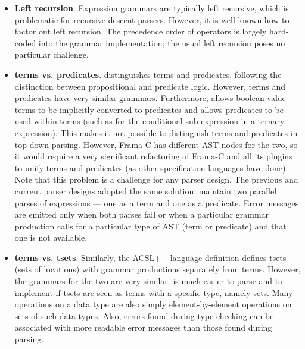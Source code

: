 \begin{itemize}
\item \textbf{Left recursion}. Expression grammars are typically left recursive, which is problematic for recursive descent parsers. 
However, it is well-known how to factor out left recursion. 
The precedence order of operators is largely hard-coded into the grammar implementation; the usual left recursion poses no particular challenge.

\item \textbf{terms vs. predicates}. \acslpp distinguishes terms and predicates, following the distinction between propositional and predicate logic. 
However, terms and predicates have very similar grammars. 
Furthermore, \acslpp allows boolean-value terms to be implicitly converted to predicates and allows predicates to be used within terms (such as for the conditional sub-expression in a ternary expression). 
This makes it not possible to distinguish terms and predicates in top-down parsing. 
However, Frama-C has different AST nodes for the two, so it would require a very significant refactoring of Frama-C and all its plugins to unify terms and predicates (as other specification languages have done). 
Note that this problem is a challenge for any parser design. 
The previous and current parser designs adopted the same solution: maintain two parallel parses of expressions --- one as a term and one as a predicate. 
Error messages are emitted only when both parses fail or when a particular grammar production calls for a particular type of AST (term or predicate) and that one is not available.

\item \textbf{terms vs. tsets}. Similarly, the ACSL++ language definition defines tsets (sets of locations) with grammar productions separately from terms. 
However, the grammars for the two are very similar. 
\acslpp is much easier to parse and to implement if tsets are seen as terms with a specific type, namely sets. 
Many operations on a data type are also simply element-by-element operations on sets of such data types.
Also, errors found during type-checking can be associated with more readable error messages than those found during parsing.


\end{itemize}
